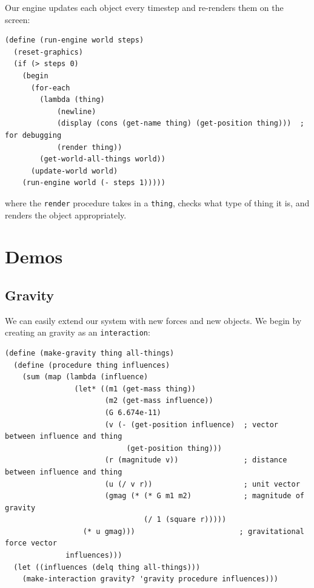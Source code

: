\documentclass{article}
\begin{document}
Our engine updates each object every timestep and re-renders them on the
screen:

\begin{verbatim}
(define (run-engine world steps)
  (reset-graphics)
  (if (> steps 0)
    (begin 
      (for-each 
        (lambda (thing)
            (newline)
            (display (cons (get-name thing) (get-position thing)))  ; for debugging
            (render thing))
        (get-world-all-things world))
      (update-world world)
    (run-engine world (- steps 1)))))
\end{verbatim}

where the \texttt{render} procedure takes in a \texttt{thing}, checks what type
of thing it is, and renders the object appropriately.

\section{Demos}
\subsection{Gravity}

We can easily extend our system with new forces and new objects. We begin by
creating an gravity as an \texttt{interaction}:

{\small\begin{verbatim}
(define (make-gravity thing all-things)
  (define (procedure thing influences)
    (sum (map (lambda (influence)
                (let* ((m1 (get-mass thing))
                       (m2 (get-mass influence))
                       (G 6.674e-11)
                       (v (- (get-position influence)  ; vector between influence and thing
                            (get-position thing)))
                       (r (magnitude v))               ; distance between influence and thing
                       (u (/ v r))                     ; unit vector
                       (gmag (* (* G m1 m2)            ; magnitude of gravity
                                (/ 1 (square r)))))
                  (* u gmag)))                        ; gravitational force vector
              influences)))
  (let ((influences (delq thing all-things)))
    (make-interaction gravity? 'gravity procedure influences)))
\end{verbatim}}
\end{document}
